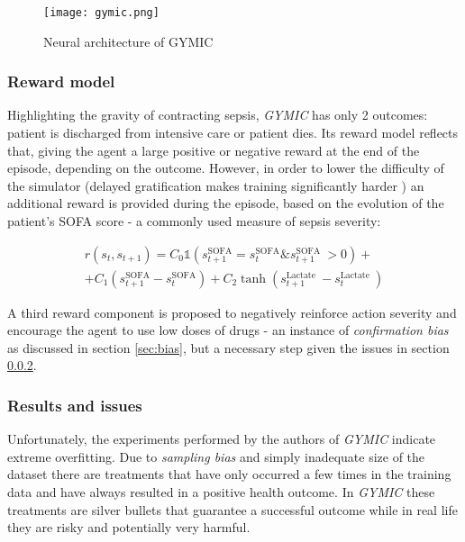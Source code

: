 \begin{figure}
    \centering
    \texttt{[image: gymic.png]}
    \caption{Neural architecture of GYMIC}
    \label{fig:gymic}
\end{figure}

\subsubsection{Reward model}

Highlighting the gravity of contracting sepsis, \emph{GYMIC} has only 2 outcomes: patient is discharged from intensive care or patient dies.
Its reward model reflects that, giving the agent a large positive or negative reward at the end of the episode, depending on the outcome.
However, in order to lower the difficulty of the simulator (delayed gratification makes training significantly harder \cite{delayedgrat-humans, delayedgrat-ai}) an additional reward is provided during the episode, based on the evolution of the patient's SOFA score \cite{sofa} - a commonly used measure of sepsis severity:

\begin{multline}
r\left(s_{t}, s_{t+1}\right)=C_{0} \mathbb{1}\left(s_{t+1}^{\mathrm{SOFA}}=s_{t}^{\mathrm{SOFA}} \& s_{t+1}^{\text {SOFA }}>0\right) + \\ +
C_{1}\left(s_{t+1}^{\mathrm{SOFA}}-s_{t}^{\mathrm{SOFA}}\right) + 
C_{2} \tanh \left(s_{t+1}^{\text {Lactate }}-s_{t}^{\text {Lactate }}\right)
\end{multline}

A third reward component is proposed to negatively reinforce action severity and encourage the agent to use low doses of drugs - an instance of \emph{confirmation bias} as discussed in section \ref{sec:bias}, but a necessary step given the issues in section \ref{sec:gymic-results}.

\subsubsection{Results and issues}
\label{sec:gymic-results}

Unfortunately, the experiments performed by the authors of \emph{GYMIC} indicate extreme overfitting.
Due to \emph{sampling bias} and simply inadequate size of the dataset there are treatments that have only occurred a few times in the training data and have always resulted in a positive health outcome.
In \emph{GYMIC} these treatments are silver bullets that guarantee a successful outcome while in real life they are risky and potentially very harmful.
